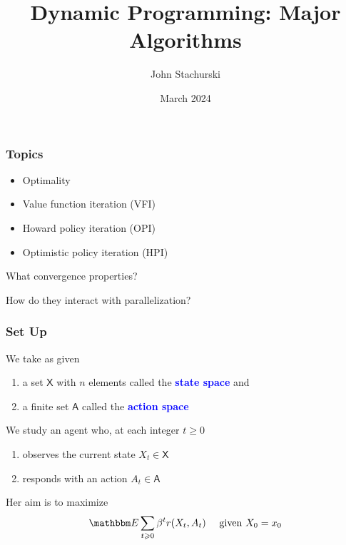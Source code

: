 \documentclass[xcolor=dvipsnames]{beamer}
\date[\today]{}
\title{Dynamic Programming: Major Algorithms}
\author{John Stachurski}
\date{March 2024}
\renewcommand{\geq}{\geqslant}
\newcommand{\navy}[1]{\textcolor{Blue}{\bf #1}}
\newcommand{\EE}{\mathbbm E}
\newcommand{\Asf}{\mathsf A}
\newcommand{\Xsf}{\mathsf X}
\renewcommand{\geq}{\geqslant}
\newcommand{\1}{\mathbbm 1}
\begin{document}
\begin{frame}
  \titlepage
\end{frame}



\begin{frame}
    \frametitle{Topics}

    \begin{itemize}
        \item Optimality
        \vspace{0.5em}
        \item Value function iteration (VFI)
        \vspace{0.5em}
        \item Howard policy iteration (OPI)
        \vspace{0.5em}
        \item Optimistic policy iteration (HPI)
    \end{itemize}

        \vspace{0.5em}
        \vspace{0.5em}
        \vspace{0.5em}

    What convergence properties?
        \vspace{0.5em}

    How do they interact with parallelization? 

\end{frame}




\begin{frame}
    \frametitle{Set Up}

    We take as given 
    \begin{enumerate}
        \item a set $\Xsf$ with $n$ elements called the \navy{state space} and
    \vspace{0.5em}
        \item a finite set $\Asf$ called the \navy{action space}
    \end{enumerate}
     
    \vspace{0.5em}
    We study an agent who, at each integer $t \geq 0$
    \begin{enumerate}
        \item observes the current state $X_t \in \Xsf$
    \vspace{0.5em}
        \item responds with an action $A_t \in \Asf$
    \end{enumerate}

    \vspace{0.5em}
    \vspace{0.5em}
    \vspace{0.5em}
    Her aim is to maximize 
    \begin{equation*}\label{eq:dmdp_ob}
        \EE \sum_{t \geq 0} \beta^t r(X_t, A_t)
        \quad \text{ given } X_0 = x_0 
    \end{equation*}


\end{frame}
\end{document}
